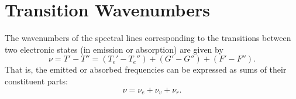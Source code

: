 \section{Transition Wavenumbers}
\label{s:transition_wavenumbers}

The wavenumbers of the spectral lines corresponding to the transitions between two electronic states (in emission or absorption) are given by
\begin{equation}
    \nu = T' - T'' = (T_{e}' - T_{e}'') + (G' - G'') + (F' - F'').
\end{equation}
That is, the emitted or absorbed frequencies can be expressed as sums of their constituent parts:
\begin{equation*}
    \nu = \nu_{e} + \nu_{v} + \nu_{r}.
\end{equation*}
